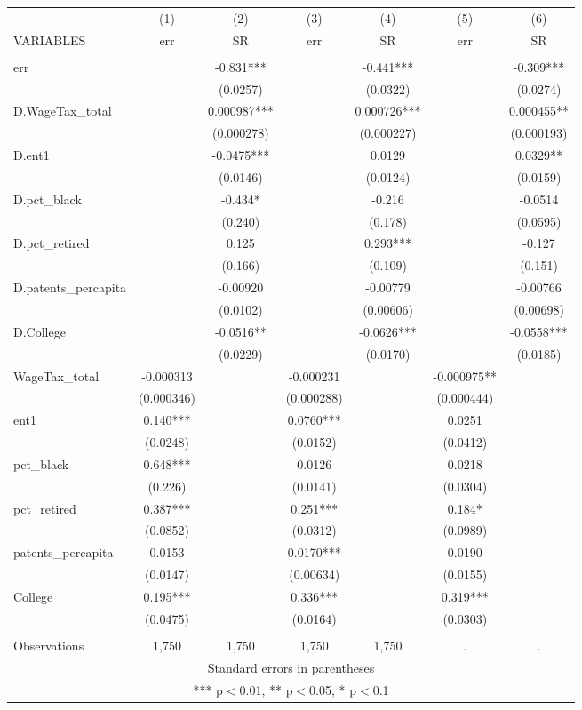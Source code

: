 \begin{tabular}{lcccccc} \hline
 & (1) & (2) & (3) & (4) & (5) & (6) \\
VARIABLES & err & SR & err & SR & err & SR \\ \hline
 &  &  &  &  &  &  \\
err &  & -0.831*** &  & -0.441*** &  & -0.309*** \\
 &  & (0.0257) &  & (0.0322) &  & (0.0274) \\
D.WageTax\_total &  & 0.000987*** &  & 0.000726*** &  & 0.000455** \\
 &  & (0.000278) &  & (0.000227) &  & (0.000193) \\
D.ent1 &  & -0.0475*** &  & 0.0129 &  & 0.0329** \\
 &  & (0.0146) &  & (0.0124) &  & (0.0159) \\
D.pct\_black &  & -0.434* &  & -0.216 &  & -0.0514 \\
 &  & (0.240) &  & (0.178) &  & (0.0595) \\
D.pct\_retired &  & 0.125 &  & 0.293*** &  & -0.127 \\
 &  & (0.166) &  & (0.109) &  & (0.151) \\
D.patents\_percapita &  & -0.00920 &  & -0.00779 &  & -0.00766 \\
 &  & (0.0102) &  & (0.00606) &  & (0.00698) \\
D.College &  & -0.0516** &  & -0.0626*** &  & -0.0558*** \\
 &  & (0.0229) &  & (0.0170) &  & (0.0185) \\
WageTax\_total & -0.000313 &  & -0.000231 &  & -0.000975** &  \\
 & (0.000346) &  & (0.000288) &  & (0.000444) &  \\
ent1 & 0.140*** &  & 0.0760*** &  & 0.0251 &  \\
 & (0.0248) &  & (0.0152) &  & (0.0412) &  \\
pct\_black & 0.648*** &  & 0.0126 &  & 0.0218 &  \\
 & (0.226) &  & (0.0141) &  & (0.0304) &  \\
pct\_retired & 0.387*** &  & 0.251*** &  & 0.184* &  \\
 & (0.0852) &  & (0.0312) &  & (0.0989) &  \\
patents\_percapita & 0.0153 &  & 0.0170*** &  & 0.0190 &  \\
 & (0.0147) &  & (0.00634) &  & (0.0155) &  \\
College & 0.195*** &  & 0.336*** &  & 0.319*** &  \\
 & (0.0475) &  & (0.0164) &  & (0.0303) &  \\
 &  &  &  &  &  &  \\
 Observations & 1,750 & 1,750 & 1,750 & 1,750 & . & . \\ \hline
\multicolumn{7}{c}{ Standard errors in parentheses} \\
\multicolumn{7}{c}{ *** p$<$0.01, ** p$<$0.05, * p$<$0.1} \\
\end{tabular}
